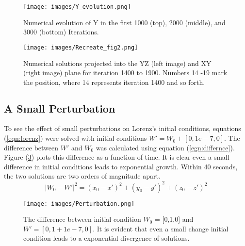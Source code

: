 \documentclass[12pt]{article}
\begin{document}
\begin{figure}[h]
    \centering
    \texttt{[image: images/Y\_evolution.png]}
    \caption{Numerical evolution of Y in the first 1000 (top), 2000 (middle), and 3000 (bottom) Iterations.}
    \label{fig:myfig1}
\end{figure}

\begin{figure}[h]
    \centering
    \texttt{[image: images/Recreate\_fig2.png]}
    \caption{Numerical solutions projected into the YZ (left image) and XY (right image) plane for iteration 1400 to 1900. Numbers 14 -19 mark the position, where 14 represents iteration 1400 and so forth.}
    \label{fig:myfig2}
\end{figure}


\subsection{A Small Perturbation}
To see the effect of small perturbations on Lorenz's initial conditions, equations (\ref{eqn:lorenz}) were solved with initial conditions $W' = W_0 + [0, 1e-7, 0]$. The difference between $W'$ and $W_0$ was calculated using equation (\ref{egn:differnce}). Figure (\ref{fig:diverge}) plots this difference as a function of time. It is clear even a small difference in initial conditions leads to exponential growth. Within 40 seconds, the two solutions are two orders of magnitude apart.  
\begin{equation}\label{egn:differnce}
    |W_0 - W'|^2 = (x_0 - x')^2 + (y_0 - y')^2 + (z_0 - z')^2
\end{equation}
\begin{figure}[h]
    \centering
    \texttt{[image: images/Perturbation.png]}
    \caption{The difference between initial condition $W_0$ = [0,1,0] and $W' = [0,1 +1e-7,0]$. It is evident that even a small change initial condition leads to a exponential divergence of solutions. }
    \label{fig:diverge}
\end{figure}

\section{}\label{references}



\end{document}
